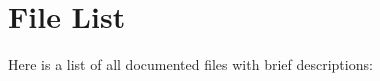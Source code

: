 \section{File List}
Here is a list of all documented files with brief descriptions\+:\begin{DoxyCompactList}
\item{}
\end{DoxyCompactList}
